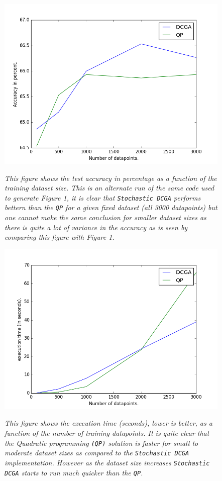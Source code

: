 \documentclass[a4paper,11pt]{article}
\begin{document}
\begin{figure}[ht]
    \centering
    \includegraphics[width=1.1\linewidth]{figure_12.png}
    \label{fig:f12}
    \caption{\textit{This figure shows the test accuracy in percentage as a function of the training dataset size. This is an alternate run of the same code used to generate Figure 1, it is clear that \texttt{Stochastic DCGA} performs bettern than the \texttt{QP} for a given fixed dataset (all 3000 datapoints) but one cannot make the same conclusion for smaller dataset sizes as there is quite a lot of variance in the accuracy as is seen by comparing this figure with Figure 1.}} 
\end{figure}

\begin{figure}[ht]
    \centering
    \includegraphics[width=1.1\linewidth]{runtime.png}
    \label{fig:f2}
    \caption{\textit{This figure shows the execution time (seconds), lower is better, as a function of the number of training datapoints. It is quite clear that the Quadratic programming \texttt{(QP)} solution is faster for small to moderate dataset sizes as compared to the \texttt{Stochastic DCGA} implementation. However as the dataset size increases \texttt{Stochastic DCGA} starts to run much quicker than the \texttt{QP}.}}
\end{figure}
\end{document}
